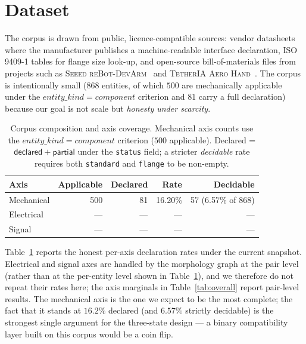 \documentclass[review]{elsarticle}
\begin{document}
\section{Dataset}

The corpus is drawn from public, licence-compatible sources: vendor
datasheets where the manufacturer publishes a machine-readable
interface declaration, ISO 9409-1 tables for flange size look-up,
and open-source bill-of-materials files from projects such as
\textsc{Seeed reBot-DevArm}~\cite{R14} and \textsc{TetherIA Aero
Hand}~\cite{R15}. The corpus is intentionally small
($868$ entities, of which $500$ are mechanically applicable under
the $entity\_kind=component$ criterion and $81$ carry a full
declaration) because our goal is not scale but
\emph{honesty under scarcity}.

\begin{table}[ht]
\centering
\caption{Corpus composition and axis coverage. Mechanical axis counts
use the $entity\_kind=component$ criterion ($500$ applicable).
Declared = $\mathsf{declared}+\mathsf{partial}$ under the
\texttt{status} field; a stricter \emph{decidable} rate requires
both \texttt{standard} and \texttt{flange} to be non-empty.}
\label{tab:corpus}
\begin{tabular}{@{}lrrrr@{}}
\toprule
Axis       & Applicable & Declared & Rate & Decidable \\
\midrule
Mechanical & 500        & 81       & 16.20\% & 57 (6.57\% of 868) \\
Electrical & ---        & ---      & ---     & --- \\
Signal     & ---        & ---      & ---     & --- \\
\bottomrule
\end{tabular}
\end{table}

Table~\ref{tab:corpus} reports the honest per-axis declaration rates
under the current snapshot. Electrical and signal axes are handled by
the morphology graph at the pair level (rather than at the
per-entity level shown in Table~\ref{tab:corpus}), and we therefore
do not repeat their rates here; the axis marginals in Table~\ref{tab:overall}
report pair-level results. The mechanical axis is the one we expect
to be the most complete; the fact that it stands at $16.2\%$
declared (and $6.57\%$ strictly decidable) is the strongest single
argument for the three-state design --- a binary compatibility layer
built on this corpus would be a coin flip.
\end{document}
